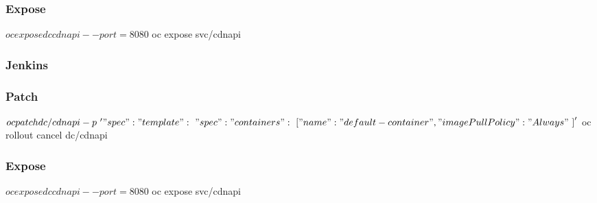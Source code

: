 \begin{frame}[fragile]
  \frametitle{Expose}
  \begin{bashcode}
    $ oc expose dc cdnapi --port=8080
    $ oc expose svc/cdnapi
  \end{bashcode}
\end{frame}

\begin{frame}[fragile]
  \frametitle{Jenkins}
\end{frame}

\begin{frame}[fragile]
  \frametitle{Patch}
  \begin{bashcode}
    $ oc patch dc/cdnapi -p \
    '{"spec":{"template":\
        {"spec":{"containers":\
            [{"name":"default-
              container","imagePullPolicy":"Always"\
            }]}}}}'
    $ oc rollout cancel dc/cdnapi
  \end{bashcode}
\end{frame}

\begin{frame}[fragile]
  \frametitle{Expose}
  \begin{bashcode}
    $ oc expose dc cdnapi --port=8080
    $ oc expose svc/cdnapi
  \end{bashcode}
\end{frame}
